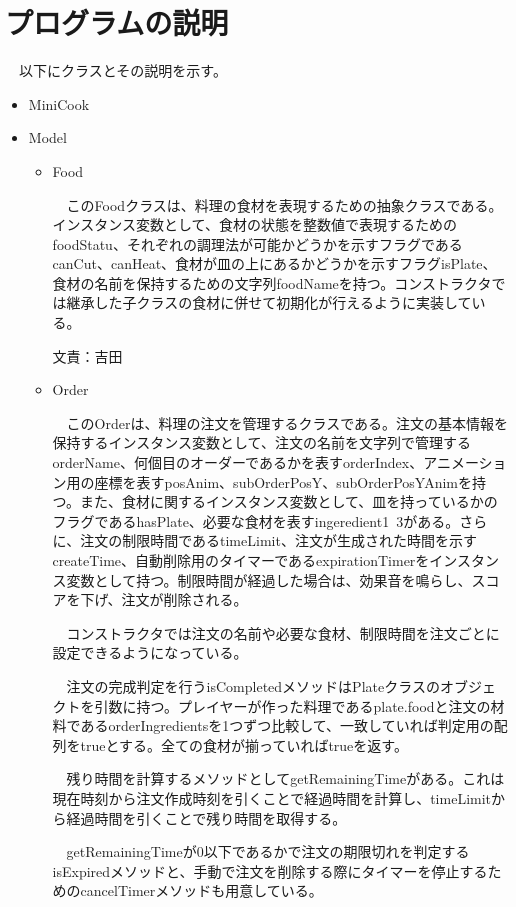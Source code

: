 \documentclass[a4j]{jsarticle} %
\begin{document}
\section{プログラムの説明}
　以下にクラスとその説明を示す。
\begin{itemize}
  \item MiniCook\par
  \item Model\par
  \begin{itemize}
    \item Food\par
    　このFoodクラスは、料理の食材を表現するための抽象クラスである。インスタンス変数として、食材の状態を整数値で表現するためのfoodStatu、それぞれの調理法が可能かどうかを示すフラグであるcanCut、canHeat、食材が皿の上にあるかどうかを示すフラグisPlate、食材の名前を保持するための文字列foodNameを持つ。コンストラクタでは継承した子クラスの食材に併せて初期化が行えるように実装している。

    文責：吉田
    \item Order\par
    　このOrderは、料理の注文を管理するクラスである。注文の基本情報を保持するインスタンス変数として、注文の名前を文字列で管理するorderName、何個目のオーダーであるかを表すorderIndex、アニメーション用の座標を表すposAnim、subOrderPosY、subOrderPosYAnimを持つ。また、食材に関するインスタンス変数として、皿を持っているかのフラグであるhasPlate、必要な食材を表すingeredient1~3がある。さらに、注文の制限時間であるtimeLimit、注文が生成された時間を示すcreateTime、自動削除用のタイマーであるexpirationTimerをインスタンス変数として持つ。制限時間が経過した場合は、効果音を鳴らし、スコアを下げ、注文が削除される。

    　コンストラクタでは注文の名前や必要な食材、制限時間を注文ごとに設定できるようになっている。

    　注文の完成判定を行うisCompletedメソッドはPlateクラスのオブジェクトを引数に持つ。プレイヤーが作った料理であるplate.foodと注文の材料であるorderIngredientsを1つずつ比較して、一致していれば判定用の配列をtrueとする。全ての食材が揃っていればtrueを返す。

    　残り時間を計算するメソッドとしてgetRemainingTimeがある。これは現在時刻から注文作成時刻を引くことで経過時間を計算し、timeLimitから経過時間を引くことで残り時間を取得する。

    　getRemainingTimeが0以下であるかで注文の期限切れを判定するisExpiredメソッドと、手動で注文を削除する際にタイマーを停止するためのcancelTimerメソッドも用意している。


\end{itemize}
\end{itemize}
\end{document}
